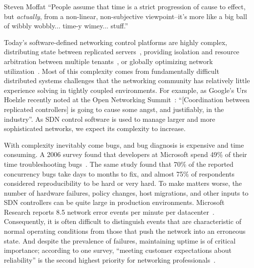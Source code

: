 \begin{aquote}{Steven Moffat}
``People assume that time is a strict progression of cause to effect,
but {\em actually}, from a non-linear, non-subjective viewpoint--it's more like a
big ball of wibbly wobbly... time-y wimey... stuff.''
\end{aquote}

Today's software-defined networking control platforms are highly complex,
distributing state between replicated
servers~\cite{floodlight},
providing isolation and resource arbitration between multiple
tenants~\cite{Casado:2010:VNF:1921151.1921162}, or
globally optimizing network utilization~\cite{urs}.
Most of this complexity comes from
fundamentally difficult distributed systems challenges that the networking community has
relatively little experience
solving in tightly coupled environments. %
For example, as Google's Urs H$\ddot{\mathrm{o}}$elzle recently
noted at the Open Networking Summit~\cite{urs}: ``[Coordination between replicated controllers] is going to
cause some angst, and justifiably, in the industry''. As SDN control software
is used to manage larger and more sophisticated networks,
we expect its complexity to increase.

With complexity inevitably come
bugs, and bug diagnosis is expensive and time consuming. A 2006 survey found
that developers at Microsoft spend 49\% of their
time troubleshooting bugs~\cite{msoft_concurrency}. The same study found that 70\% of the reported concurrency bugs
take days to months to fix, and almost 75\% of
respondents considered reproducibility to be hard or very hard.
To make matters worse, the number of hardware failures,
policy changes, host migrations, and other inputs to SDN controllers can
be quite large in production environments. Microsoft Research
reports 8.5 network error events per minute per
datacenter~\cite{Greenberg:2009:VSF:1592568.1592576}.
Consequently, it is often difficult to distinguish events that are
characteristic of normal operating
conditions from those that push the network into an erroneous state.
And despite the prevalence of failures, maintaining uptime is of critical importance; according to one
survey, ``meeting customer expectations about reliability'' is the second highest
priority for networking professionals~\cite{market_report}.


